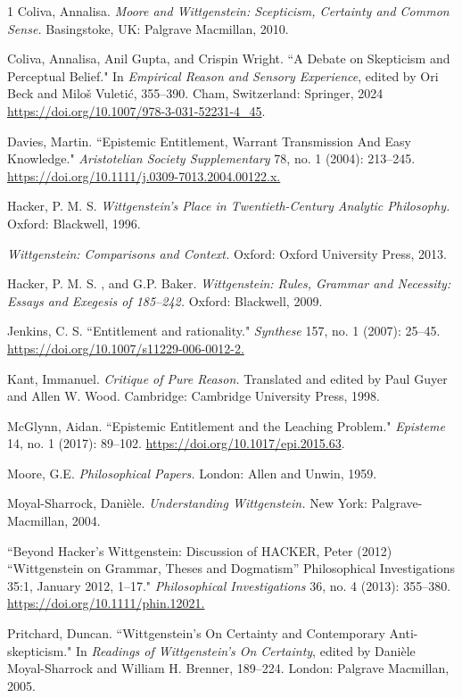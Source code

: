 \begin{hangparas}{\hangingindent}{1}
Coliva, Annalisa. \emph{Moore and Wittgenstein: Scepticism, Certainty
and Common Sense.} Basingstoke, UK: Palgrave Macmillan, 2010.

Coliva,
Annalisa, Anil Gupta, and Crispin Wright. ``A Debate on Skepticism and
Perceptual Belief." In \emph{Empirical Reason and Sensory Experience},
edited by Ori Beck and Miloš Vuletić, 355--390. Cham, Switzerland:
Springer, 2024 
\url{https://doi.org/10.1007/978-3-031-52231-4\_45}.

Davies,
Martin. ``Epistemic Entitlement, Warrant Transmission And Easy
Knowledge." \emph{Aristotelian Society Supplementary} 78, no. 1 (2004):
213--245. 
\url{https://doi.org/10.1111/j.0309-7013.2004.00122.x.}

Hacker, P. M.
S. \emph{Wittgenstein's Place in Twentieth-Century Analytic Philosophy.}
Oxford: Blackwell, 1996.

\emph{Wittgenstein: Comparisons and
Context.} Oxford: Oxford University Press, 2013.

Hacker, P. M. S. , and
G.P. Baker. \emph{Wittgenstein: Rules, Grammar and Necessity: Essays and
Exegesis of 185--242.} Oxford: Blackwell, 2009.

Jenkins, C. S.
``Entitlement and rationality." \emph{Synthese} 157, no. 1 (2007): 25--45.
\url{https://doi.org/10.1007/s11229-006-0012-2.}

Kant, Immanuel. \emph{Critique
of Pure Reason.} Translated and edited by Paul Guyer and Allen W. Wood.
Cambridge: Cambridge University Press, 1998.

McGlynn, Aidan. ``Epistemic
Entitlement and the Leaching Problem." \emph{Episteme} 14, no. 1 (2017):
89--102. 
\url{https://doi.org/10.1017/epi.2015.63}.

Moore, G.E.
\emph{Philosophical Papers.} London: Allen and Unwin,
1959.

Moyal-Sharrock, Danièle. \emph{Understanding Wittgenstein.} New
York: Palgrave-Macmillan, 2004.

``Beyond Hacker's Wittgenstein:
Discussion of HACKER, Peter (2012) ``Wittgenstein on Grammar, Theses and
Dogmatism'' Philosophical Investigations 35:1, January 2012, 1--17."
\emph{Philosophical Investigations} 36, no. 4 (2013): 355--380.
\url{https://doi.org/10.1111/phin.12021.}

Pritchard, Duncan. ``Wittgenstein's On
Certainty and Contemporary Anti-skepticism." In \emph{Readings of
Wittgenstein's On Certainty}, edited by Danièle Moyal-Sharrock and
William H. Brenner, 189--224. London: Palgrave Macmillan, 2005.


\end{hangparas}
